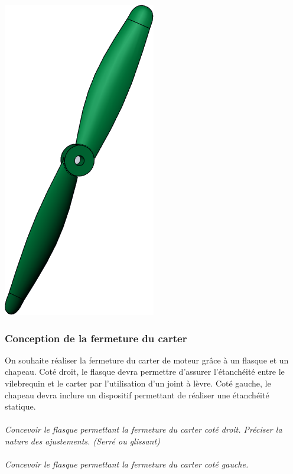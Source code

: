 \documentclass[11pt,oneside]{article}
\begin{document}
\begin{minipage}[c]{.3\linewidth}
\begin{center}
\includegraphics[width=.8\textwidth]{png/helice}
\end{center}
\end{minipage}



\subsubsection*{Conception de la fermeture du carter}

On souhaite réaliser la fermeture du carter de moteur grâce à un flasque et un chapeau. Coté droit, le flasque devra permettre d'assurer l'étanchéité entre le vilebrequin et le carter par l'utilisation d'un joint à lèvre. Coté gauche, le chapeau devra inclure un dispositif permettant de réaliser une étanchéité statique.

\paragraph{}
\textit{Concevoir le flasque permettant la fermeture du carter coté droit. Préciser la nature des ajustements. (Serré ou glissant)}
\paragraph{}
\textit{Concevoir le flasque permettant la fermeture du carter coté gauche.}

%
\end{document}
